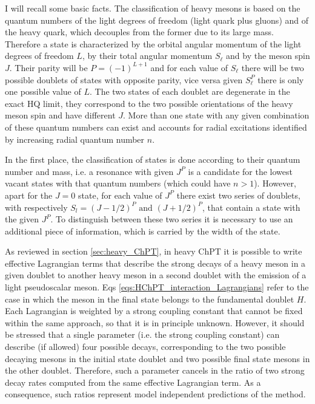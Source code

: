 I will recall some basic facts. The classification of heavy mesons is based on the quantum numbers of the light degrees of freedom (light quark plus gluons) and of the heavy quark, which decouples from the former due to its large mass. Therefore a state is characterized by the orbital angular momentum of the light degrees of freedom $L$, by their total angular momentum $S_\ell$ and by the meson spin $J$. Their parity will be $P = (-1)^{L + 1}$ and for each value of $S_\ell$ there will be two possible doublets of states with opposite parity, vice versa given $S_\ell^P$ there is only one possible value of $L$. The two states of each doublet are degenerate in the exact HQ limit, they correspond to the two possible orientations of the heavy meson spin and have different $J$. More than one state with any given combination of these quantum numbers can exist and accounts for radial excitations identified by increasing radial quantum number $n$.

In the first place, the classification of states is done according to their quantum number and mass, i.e. a resonance with given $J^P$ is a candidate for the lowest vacant states with that quantum numbers (which could have $n > 1$). However, apart for the $J = 0$ state, for each value of $J^P$ there exist two series of doublets, with respectively $S_l = \left( J - 1/2 \right)^P \text{ and } \left( J + 1/2 \right)^P$, that contain a state with the given $J^P$. To distinguish between these two series it is necessary to use an additional piece of information, which is carried by the width of the state.

As reviewed in section \ref{sec:heavy_ChPT}, in heavy ChPT it is possible to write effective Lagrangian terms that describe the strong decays of a heavy meson in a given doublet to another heavy meson in a second doublet with the emission of a light pseudoscalar meson. Eqs \ref{eqs:HChPT_interaction_Lagrangians} refer to the case in which the meson in the final state belongs to the fundamental doublet $H$. Each Lagrangian is weighted by a strong coupling constant that cannot be fixed within the same approach, so that it is in principle unknown. However, it should be stressed that a single parameter (i.e. the strong coupling constant) can describe (if allowed) four possible decays, corresponding to the two possible decaying mesons in the initial state doublet and two possible final state mesons in the other doublet. Therefore, such a parameter cancels in  the ratio of two strong decay rates computed from the same effective Lagrangian term. As a consequence, such ratios represent model independent predictions of the method.

